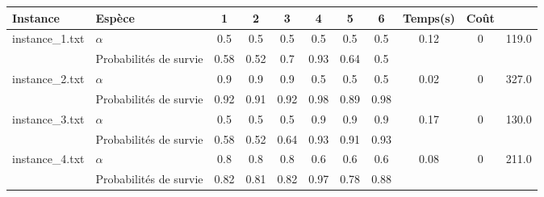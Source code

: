 \documentclass[main.tex]{subfiles}
\begin{document}
	\begin{center}
	\begin{tabular}{|l||l|c|c|c|c|c|c||c|c|c|}
    \hline
    \textbf{Instance}&\textbf{Espèce}&1&2&3&4&5&6&\textbf{Temps(s)}&\textbf{Coût}\\

\hline\hline
instance\_1.txt &$\alpha$&0.5 &0.5 &0.5 &0.5 &0.5 &0.5 &0.12 &0 &119.0\\
&Probabilités de survie &0.58 &0.52 &0.7 &0.93 &0.64 &0.5 && &\\

\hline\hline
instance\_2.txt &$\alpha$&0.9 &0.9 &0.9 &0.5 &0.5 &0.5 &0.02 &0 &327.0\\
&Probabilités de survie &0.92 &0.91 &0.92 &0.98 &0.89 &0.98 && &\\

\hline\hline
instance\_3.txt &$\alpha$&0.5 &0.5 &0.5 &0.9 &0.9 &0.9 &0.17 &0 &130.0\\
&Probabilités de survie &0.58 &0.52 &0.64 &0.93 &0.91 &0.93 && &\\

\hline\hline
instance\_4.txt &$\alpha$&0.8 &0.8 &0.8 &0.6 &0.6 &0.6 &0.08 &0 &211.0\\
&Probabilités de survie &0.82 &0.81 &0.82 &0.97 &0.78 &0.88 && &\\
\hline
    \end{tabular}
	\end{center}
	
\end{document}
